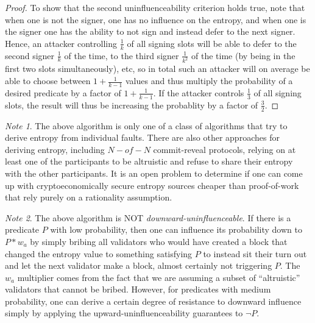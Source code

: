 \documentclass[11pt,a4paper]{article}
\theoremstyle{plain}
\theoremstyle{definition}
\theoremstyle{remark}
\newtheorem*{note}{Note}
\begin{document}
\begin{proof}
To show that the second uninfluenceability criterion holds true, note that when one is not the signer, one has no influence on the entropy, and when one is the signer one has the ability to not sign and instead defer to the next signer. Hence, an attacker controlling $\frac{1}{k}$ of all signing slots will be able to defer to the second signer $\frac{1}{k}$ of the time, to the third signer $\frac{1}{k^2}$ of the time (by being in the first two slots simultaneously), etc, so in total such an attacker will on average be able to choose between $1 + \frac{1}{k-1}$ values and thus multiply the probability of a desired predicate by a factor of $1 + \frac{1}{k-1}$. If the attacker controls $\frac{1}{3}$ of all signing slots, the result will thus be increasing the probablity by a factor of $\frac{3}{2}$.
\end{proof}

\begin{note}
The above algorithm is only one of a class of algorithms that try to derive entropy from individual faults. There are also other approaches for deriving entropy, including $N-of-N$ commit-reveal protocols, relying on at least one of the participants to be altruistic and refuse to share their entropy with the other participants. It is an open problem to determine if one can come up with cryptoeconomically secure entropy sources cheaper than proof-of-work that rely purely on a rationality assumption.
\end{note}

\begin{note}
The above algorithm is NOT \emph{downward-uninfluenceable}. If there is a predicate $P$ with low probability, then one can influence its probability down to $P * w_a$ by simply bribing all validators who would have created a block that changed the entropy value to something satisfying $P$ to instead sit their turn out and let the next validator make a block, almost certainly not triggering $P$. The $w_a$ multiplier comes from the fact that we are assuming a subset of ``altruistic'' validators that cannot be bribed. However, for predicates with medium probability, one can derive a certain degree of resistance to downward influence simply by applying the upward-uninfluenceability guarantees to $\neg P$.
\end{note}
\end{document}
